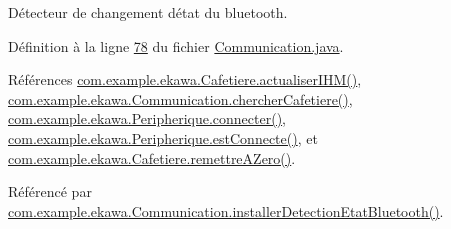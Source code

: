 Détecteur de changement d\textquotesingle{}état du bluetooth. 



Définition à la ligne \hyperlink{_communication_8java_source_l00078}{78} du fichier \hyperlink{_communication_8java_source}{Communication.\+java}.



Références \hyperlink{_cafetiere_8java_source_l00674}{com.\+example.\+ekawa.\+Cafetiere.\+actualiser\+I\+H\+M()}, \hyperlink{_communication_8java_source_l00276}{com.\+example.\+ekawa.\+Communication.\+chercher\+Cafetiere()}, \hyperlink{_peripherique_8java_source_l00101}{com.\+example.\+ekawa.\+Peripherique.\+connecter()}, \hyperlink{_peripherique_8java_source_l00234}{com.\+example.\+ekawa.\+Peripherique.\+est\+Connecte()}, et \hyperlink{_cafetiere_8java_source_l00658}{com.\+example.\+ekawa.\+Cafetiere.\+remettre\+A\+Zero()}.



Référencé par \hyperlink{_communication_8java_source_l00339}{com.\+example.\+ekawa.\+Communication.\+installer\+Detection\+Etat\+Bluetooth()}.


